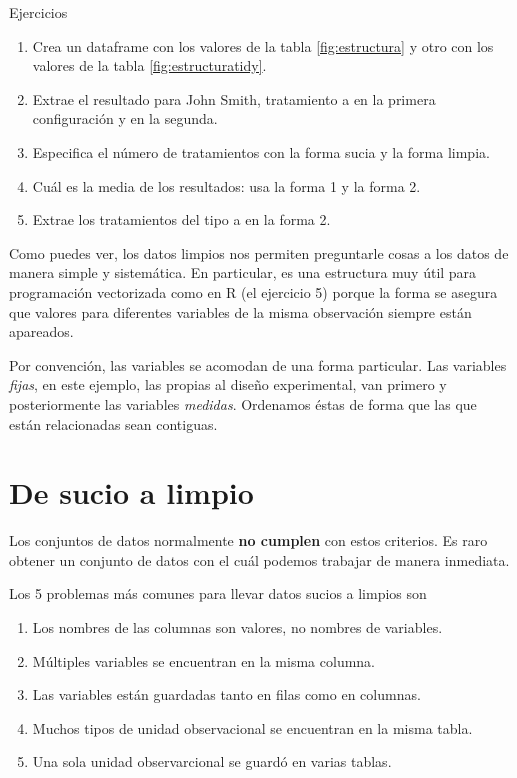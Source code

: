 \documentclass[]{article}
\begin{document}
\begin{bclogo}[
  couleur=llred,
  arrondi=0,
  logo=\bcstop,
  barre=none,
  noborder=true]{Ejercicios}
\begin{enumerate}
\item Crea un dataframe con los valores de la tabla \ref{fig:estructura} y otro 
con los valores de la tabla \ref{fig:estructuratidy}.
\item Extrae el resultado para John Smith, tratamiento a en la primera configuración y en la segunda.
\item Especifica el número de tratamientos con la forma sucia y la forma limpia.
\item Cuál es la media de los resultados: usa la forma 1 y la forma 2.
\item Extrae los tratamientos del tipo a en la forma 2.
\end{enumerate}

\end{bclogo}

Como puedes ver, los datos limpios nos permiten preguntarle cosas a los
datos de manera simple y sistemática. En particular, es una estructura
muy útil para programación vectorizada como en R (el ejercicio 5) porque
la forma se asegura que valores para diferentes variables de la misma
observación siempre están apareados.

Por convención, las variables se acomodan de una forma particular. Las
variables \emph{fijas}, en este ejemplo, las propias al diseño
experimental, van primero y posteriormente las variables \emph{medidas}.
Ordenamos éstas de forma que las que están relacionadas sean contiguas.

\section{De sucio a limpio}\label{de-sucio-a-limpio}

Los conjuntos de datos normalmente \textbf{no cumplen} con estos
criterios. Es raro obtener un conjunto de datos con el cuál podemos
trabajar de manera inmediata.

Los 5 problemas más comunes para llevar datos sucios a limpios son

\begin{enumerate}
\def\labelenumi{\arabic{enumi}.}
\itemsep1pt\parskip0pt
\item
  Los nombres de las columnas son valores, no nombres de variables.
\item
  Múltiples variables se encuentran en la misma columna.
\item
  Las variables están guardadas tanto en filas como en columnas.
\item
  Muchos tipos de unidad observacional se encuentran en la misma tabla.
\item
  Una sola unidad observarcional se guardó en varias tablas.
\end{enumerate}
\end{document}
